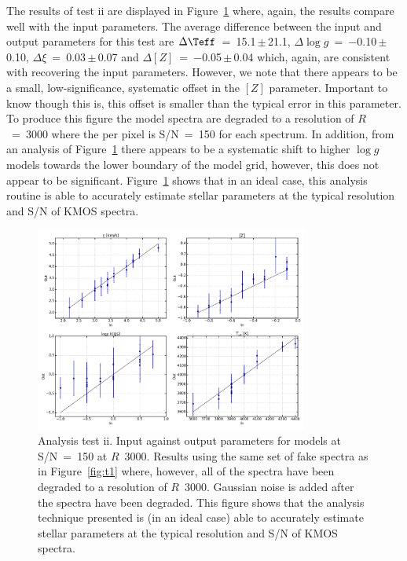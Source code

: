 The results of test ii are displayed in Figure~\ref{fig:t2} where, again, the results compare well with the input parameters.
The average difference between the input and output parameters for this test are
$\Delta\Teff$~=~15.1\,$\pm$\,21.1,  %
$\Delta\log g$~=~$-$0.10\,$\pm$\,0.10, %
$\Delta\xi$~=~0.03\,$\pm$\,0.07 and %
$\Delta[Z]$~=~$-$0.05\,$\pm$\,0.04     %
which, again, are consistent with recovering the input parameters.
However, we note that there appears to be a small, low-significance, systematic offset in the $[Z]$ parameter.
Important to know though this is, this offset is smaller than the typical error in this parameter.
To produce this figure the model spectra are degraded to a resolution of $R$~=~3000 where the per pixel is S/N~=~150 for each spectrum.
In addition, from an analysis of Figure~\ref{fig:t2} there appears to be a systematic shift to higher $\log g$ models towards the lower boundary of the model grid, however, this does not appear to be significant.
Figure~\ref{fig:t2} shows that in an ideal case, this analysis routine is able to accurately estimate stellar parameters at the typical resolution and S/N of KMOS spectra.


\begin{figure}
 \centering
 \includegraphics[width=0.80\textwidth]{JAnal/Fakespec-t2-v2}
 \caption[Analysis test ii: Input against output parameters for models at S/N~=~150 at $R$~3000]{
Analysis test ii. Input against output parameters for models at S/N~=~150 at $R$~3000.
Results using the same set of fake spectra as in Figure~\ref{fig:t1} where, however, all of the spectra have been degraded to a resolution of $R$~3000.
Gaussian noise is added after the spectra have been degraded.
This figure shows that the analysis technique presented is (in an ideal case) able to accurately estimate stellar parameters at the typical resolution and S/N of KMOS spectra.
\label{fig:t2}
         }
\end{figure}


